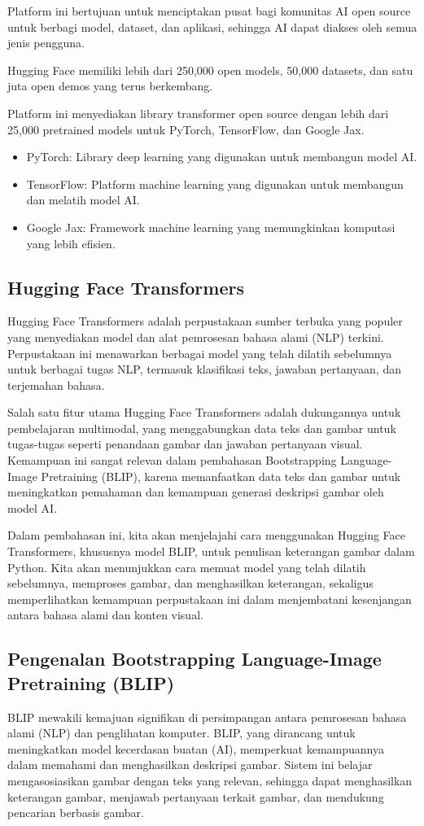 \documentclass{article}
\begin{document}
Platform ini bertujuan untuk menciptakan pusat bagi komunitas AI open source untuk berbagi model, dataset, dan aplikasi, sehingga AI dapat diakses oleh semua jenis pengguna.

Hugging Face memiliki lebih dari 250,000 open models, 50,000 datasets, dan satu juta open demos yang terus berkembang.

Platform ini menyediakan library transformer open source dengan lebih dari 25,000 pretrained models untuk PyTorch, TensorFlow, dan Google Jax.

\begin{itemize}
    \item PyTorch: Library deep learning yang digunakan untuk membangun model AI.
    \item TensorFlow: Platform machine learning yang digunakan untuk membangun dan melatih model AI.
    \item Google Jax: Framework machine learning yang memungkinkan komputasi yang lebih efisien.
\end{itemize}

\subsection{Hugging Face Transformers}
Hugging Face Transformers adalah perpustakaan sumber terbuka yang populer yang menyediakan model dan alat pemrosesan bahasa alami (NLP) terkini. Perpustakaan ini menawarkan berbagai model yang telah dilatih sebelumnya untuk berbagai tugas NLP, termasuk klasifikasi teks, jawaban pertanyaan, dan terjemahan bahasa.

Salah satu fitur utama Hugging Face Transformers adalah dukungannya untuk pembelajaran multimodal, yang menggabungkan data teks dan gambar untuk tugas-tugas seperti penandaan gambar dan jawaban pertanyaan visual. Kemampuan ini sangat relevan dalam pembahasan Bootstrapping Language-Image Pretraining (BLIP), karena memanfaatkan data teks dan gambar untuk meningkatkan pemahaman dan kemampuan generasi deskripsi gambar oleh model AI.

Dalam pembahasan ini, kita akan menjelajahi cara menggunakan Hugging Face Transformers, khususnya model BLIP, untuk penulisan keterangan gambar dalam Python. Kita akan menunjukkan cara memuat model yang telah dilatih sebelumnya, memproses gambar, dan menghasilkan keterangan, sekaligus memperlihatkan kemampuan perpustakaan ini dalam menjembatani kesenjangan antara bahasa alami dan konten visual.

\subsection{Pengenalan Bootstrapping Language-Image Pretraining (BLIP)}
BLIP mewakili kemajuan signifikan di persimpangan antara pemrosesan bahasa alami (NLP) dan penglihatan komputer. BLIP, yang dirancang untuk meningkatkan model kecerdasan buatan (AI), memperkuat kemampuannya dalam memahami dan menghasilkan deskripsi gambar. Sistem ini belajar mengasosiasikan gambar dengan teks yang relevan, sehingga dapat menghasilkan keterangan gambar, menjawab pertanyaan terkait gambar, dan mendukung pencarian berbasis gambar.
\end{document}
